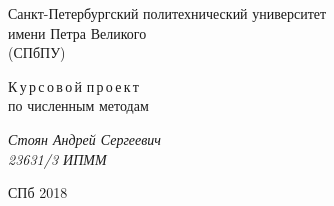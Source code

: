 \documentclass[a4paper,12pt]{article}
\begin{document}

\thispagestyle{empty}
\begin{center}
    Санкт-Петербургский политехнический университет \\ имени Петра Великого \\ (СПбПУ)
\end{center}
\vspace{13ex}

\begin{center}
    \vspace{16ex}
    {\Large {К\,у\,р\,с\,о\,в\,о\,й\,\,п\,р\,о\,е\,к\,т}} \\
    по численным методам
\end{center}
\vfill
\begin{flushright}
    \noindent
    \textit{Стоян Андрей Сергеевич \\
        23631/3 ИПММ}
\end{flushright}
\begin{center}
    СПб 2018
\end{center}
\newpage

\tableofcontents
\newpage

%
%
%
\end{document}
